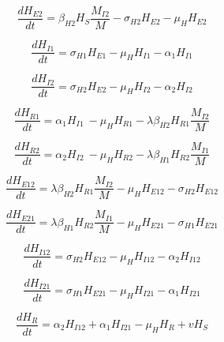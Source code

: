 \documentclass[journal]{IEEEtran}
\begin{document}
\begin{equation}
    \label{eq1}
    \frac{dH_{E2}}{dt}=\beta_{H2}H_S\frac{M_{I2}}{M}-\sigma_{H2}H_{E2}-\mu_HH_{E2}
\end{equation}


\begin{equation}
    \label{eq1}
    \frac{dH_{I1}}{dt}=\sigma_{H1}H_{E1}-\mu_HH_{I1}-\alpha_1H_{I1}
\end{equation}

\begin{equation}
    \label{eq1}
    \frac{dH_{I2}}{dt}=\sigma_{H2}H_{E2}-\mu_HH_{I2}-\alpha_2H_{I2}
\end{equation}

\begin{equation}
    \label{eq1}
    \frac{dH_{R1}}{dt}={\alpha_1H_{I1}\ -\mu}_HH_{R1}-{\lambda\beta}_{H2}H_{R1}\frac{M_{I2}}{M}
\end{equation}


\begin{equation}
    \label{eq1}
    \frac{dH_{R2}}{dt}={\alpha_2H_{I2}\ -\mu}_HH_{R2}-{\lambda\beta}_{H1}H_{R2}\frac{M_{I1}}{M}
\end{equation}


\begin{equation}
    \label{eq1}
    \frac{dH_{E12}}{dt}={\lambda\beta}_{H2}H_{R1}\frac{M_{I2}}{M}-\mu_HH_{E12}-\sigma_{H2}H_{E12}
\end{equation}


\begin{equation}
    \label{eq1}
    \frac{dH_{E21}}{dt}={\lambda\beta}_{H1}H_{R2}\frac{M_{I1}}{M}-\mu_HH_{E21}-\sigma_{H1}H_{E21}
\end{equation}


\begin{equation}
    \label{eq1}
    \frac{dH_{I12}}{dt}=\sigma_{H2}H_{E12}-\mu_HH_{I12}-\alpha_2H_{I12}
\end{equation}


\begin{equation}
    \label{eq1}
    \frac{dH_{I21}}{dt}=\sigma_{H1}H_{E21}-\mu_HH_{I21}-\alpha_1H_{I21}
\end{equation}


\begin{equation}
    \label{eq1}
    \frac{dH_R}{dt}=\alpha_2H_{I12}+\alpha_1H_{I21}-\mu_HH_R+vH_S
\end{equation}




\end{document}
